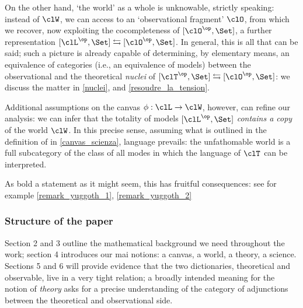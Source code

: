 On the other hand, `the world' as a whole is unknowable, strictly speaking: instead of $\clW$, we can access to an `observational fragment' $\clO$, from which we recover, now exploiting the cocompleteness of $[\clO^\op,\Set]$, a further representation $[\clL^\op,\Set] \leftrightarrows [\clO^\op,\Set]$. In general, this is all that can be said; such a picture is already capable of determining, by elementary means, an equivalence of categories (i.e., an equivalence of models) between the observational and the theoretical \emph{nuclei} of $[\clT^\op,\Set] \leftrightarrows [\clO^\op,\Set]$: we discuss the matter in \autoref{nuclei}, and \autoref{resoudre_la_tension}.

Additional assumptions on the canvas $\phi : \clL\to \clW$, however, can refine our analysis: we can infer that the totality of models $[\clL^\op,\Set]$ \emph{contains a copy} of the world $\clW$. In this precise sense, assuming what is outlined in the definition of \science in \autoref{canvas_scienza}, language prevails: the unfathomable world is a full subcategory of the class of all modes in which the language of $\clT$ can be interpreted. 

As bold a statement as it might seem, this has fruitful consequences: see for example \autoref{remark_yuggoth_1}, \autoref{remark_yuggoth_2}

\subsubsection*{Structure of the paper}
Section 2 and 3 outline the mathematical background we need throughout the work; section 4 introduces our mai notions: a canvas, a world, a theory, a science. Sections 5 and 6 will provide evidence that the two dictionaries, theoretical and observable, live in a very tight relation; a broadly intended meaning for the notion of \emph{theory} asks for a precise understanding of the category of adjunctions between the theoretical and observational side.
\color{black}

